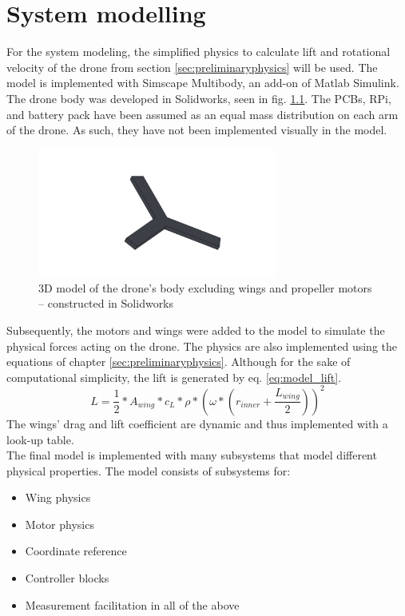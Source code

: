 \chapter{System modelling}\label{chap:systemmodelling}
For the system modeling, the simplified physics to calculate lift and rotational velocity of the drone from section \ref{sec:preliminaryphysics} will be used. The model is implemented with Simscape Multibody, an add-on of Matlab Simulink.\\

The drone body was developed in Solidworks, seen in fig. \ref{fig:drone3D}. The PCBs, RPi, and battery pack have been assumed as an equal mass distribution on each arm of the drone. As such, they have not been implemented visually in the model.
\begin{figure}[h!]
    \centering
    \includegraphics[width=0.7\textwidth]{figures/system_modelling/drone3d.PNG}
    \caption{3D model of the drone's body excluding wings and propeller motors -- constructed in Solidworks}
    \label{fig:drone3D}
\end{figure}
Subsequently, the motors and wings were added to the model to simulate the physical forces acting on the drone. The physics are also implemented using the equations of chapter \ref{sec:preliminaryphysics}. Although for the sake of computational simplicity, the lift is generated by eq. \ref{eq:model_lift}.\\
\begin{equation}
    \label{eq:model_lift}
    L = \frac{1}{2}*A_{wing}*c_L*\rho*\left(\omega*\left(r_{inner}+\frac{L_{wing}}{2}\right)\right)^2
\end{equation}
The wings' drag and lift coefficient are dynamic and thus implemented with a look-up table.\\

The final model is implemented with many subsystems that model different physical properties. The model consists of subsystems for: 
\begin{itemize}[noitemsep]
    \item Wing physics
    \item Motor physics
    \item Coordinate reference
    \item Controller blocks
    \item Measurement facilitation in all of the above
\end{itemize}

